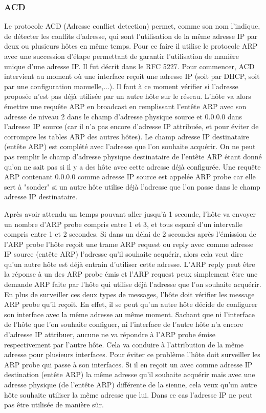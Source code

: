 \subsubsection{ACD} Le protocole ACD (Adresse conflict detection) permet, comme
son nom l'indique, de détecter les conflits d'adresse, qui sont l'utilisation
de la même adresse IP par deux ou plusieurs hôtes en même temps. Pour ce faire
il utilise le protocole ARP avec une succession d'étape permettant de garantir
l'utilisation de manière unique d'une adresse IP. Il fut décrit dans le RFC
5227\cite{url-RFC-ACD}.
\smallbreak
Pour commencer, ACD intervient au moment où une interface reçoit une adresse IP
(soit par DHCP, soit par une configuration manuelle,...). Il faut à ce moment
vérifier si l'adresse proposée n'est pas déjà utilisée par un autre hôte sur le
réseau.  L'hôte va alors émettre une requête ARP en broadcast en remplissant
l'entête ARP avec son adresse de niveau 2 dans le champ d'adresse physique
source et 0.0.0.0 dans l'adresse IP source (car il n'a pas encore d'adresse IP
attribuée, et pour éviter de corrompre les tables ARP des autres hôtes). Le
champ adresse IP destinataire (entête ARP) est complété avec l'adresse que l'on
souhaite acquérir. On ne peut pas remplir le champ d'adresse physique
destinataire de l'entête ARP étant donné qu'on ne sait pas si il y a des hôte
avec cette adresse déjà configurée.  Une requête ARP contenant 0.0.0.0 comme
adresse IP source est appelée ARP probe car elle sert à "sonder" si un autre
hôte utilise déjà l'adresse que l'on passe dans le champ adresse IP
destinataire.

\smallbreak
Après avoir attendu un temps pouvant aller jusqu'à 1 seconde, l'hôte va envoyer
un nombre d'ARP probe compris entre 1 et 3, et tous espacé d'un intervalle
compris entre 1 et 2 secondes.  Si dans un délai de 2 secondes après l'émission
de l'ARP probe l'hôte reçoit une trame ARP request ou reply avec comme adresse
IP source (entête ARP) l'adresse qu'il souhaite acquérir, alors cela veut dire
qu'un autre hôte est déjà entrain d'utiliser cette adresse. L'ARP reply peut
être la réponse à un des ARP probe émis et l'ARP request peux simplement être
une demande ARP faite par l'hôte qui utilise déjà l'adresse que l'on souhaite
acquérir. En plus de surveiller ces deux types de messages, l'hôte doit
vérifier les message ARP probe qu'il reçoit. En effet, il se peut qu'un autre
hôte décide de configurer son interface avec la même adresse au même moment.
Sachant que ni l'interface de l'hôte que l'on souhaite configuer, ni
l'interface de l'autre hôte n'a encore d'adresse IP attribuer, aucune ne va
répondre à l'ARP probe émise respectivement par l'autre hôte. Cela va conduire
à l'attribution de la même adresse pour plusieurs interfaces. Pour éviter ce
problème l'hôte doit surveiller les ARP probe qui passe à son interfaces. Si il
en reçoit un avec comme adresse IP destination (entête ARP) la même adresse
qu'il souhaite acquérir mais avec une adresse physique (de l'entête ARP)
différente de la sienne, cela veux qu'un autre hôte souhaite utiliser la même
adresse que lui. Dans ce cas l'adresse IP ne peut pas être utilisée de manière
sûr.

